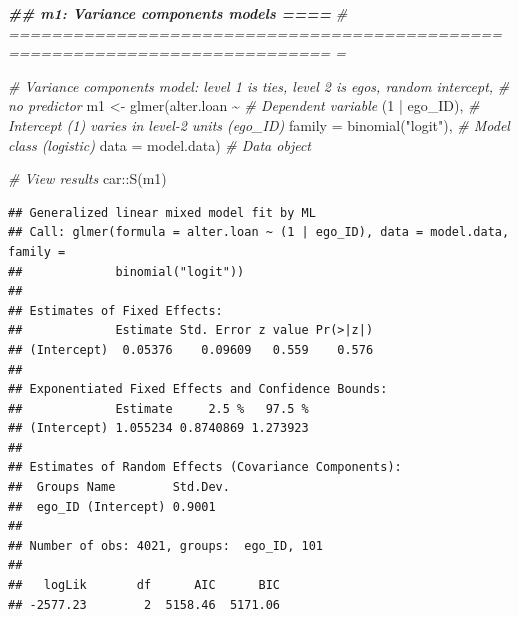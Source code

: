 \documentclass[
]{book}
\newenvironment{Shaded}{\begin{snugshade}}{\end{snugshade}}
\newcommand{\AttributeTok}[1]{\textcolor[rgb]{0.77,0.63,0.00}{#1}}
\newcommand{\CommentTok}[1]{\textcolor[rgb]{0.56,0.35,0.01}{\textit{#1}}}
\newcommand{\DecValTok}[1]{\textcolor[rgb]{0.00,0.00,0.81}{#1}}
\newcommand{\DocumentationTok}[1]{\textcolor[rgb]{0.56,0.35,0.01}{\textbf{\textit{#1}}}}
\newcommand{\FunctionTok}[1]{\textcolor[rgb]{0.00,0.00,0.00}{#1}}
\newcommand{\NormalTok}[1]{#1}
\newcommand{\OtherTok}[1]{\textcolor[rgb]{0.56,0.35,0.01}{#1}}
\newcommand{\SpecialCharTok}[1]{\textcolor[rgb]{0.00,0.00,0.00}{#1}}
\newcommand{\StringTok}[1]{\textcolor[rgb]{0.31,0.60,0.02}{#1}}
\begin{document}
\begin{Shaded}
\begin{Highlighting}[]
\DocumentationTok{\#\# m1: Variance components models                                           ====}
\CommentTok{\# ============================================================================ =}

\CommentTok{\# Variance components model: level 1 is ties, level 2 is egos, random intercept, }
\CommentTok{\# no predictor}
\NormalTok{m1 }\OtherTok{\textless{}{-}} \FunctionTok{glmer}\NormalTok{(alter.loan }\SpecialCharTok{\textasciitilde{}} \CommentTok{\# Dependent variable}
\NormalTok{              (}\DecValTok{1} \SpecialCharTok{|}\NormalTok{ ego\_ID), }\CommentTok{\# Intercept (1) varies in level{-}2 units (ego\_ID)}
            \AttributeTok{family =} \FunctionTok{binomial}\NormalTok{(}\StringTok{"logit"}\NormalTok{), }\CommentTok{\# Model class (logistic)}
            \AttributeTok{data =}\NormalTok{ model.data) }\CommentTok{\# Data object}

\CommentTok{\# View results}
\NormalTok{car}\SpecialCharTok{::}\FunctionTok{S}\NormalTok{(m1)}
\end{Highlighting}
\end{Shaded}

\begin{verbatim}
## Generalized linear mixed model fit by ML
## Call: glmer(formula = alter.loan ~ (1 | ego_ID), data = model.data, family =
##             binomial("logit"))
## 
## Estimates of Fixed Effects:
##             Estimate Std. Error z value Pr(>|z|)
## (Intercept)  0.05376    0.09609   0.559    0.576
## 
## Exponentiated Fixed Effects and Confidence Bounds:
##             Estimate     2.5 %   97.5 %
## (Intercept) 1.055234 0.8740869 1.273923
## 
## Estimates of Random Effects (Covariance Components):
##  Groups Name        Std.Dev.
##  ego_ID (Intercept) 0.9001  
## 
## Number of obs: 4021, groups:  ego_ID, 101
## 
##   logLik       df      AIC      BIC 
## -2577.23        2  5158.46  5171.06
\end{verbatim}

\begin{Shaded}
\end{Shaded}
\end{document}
